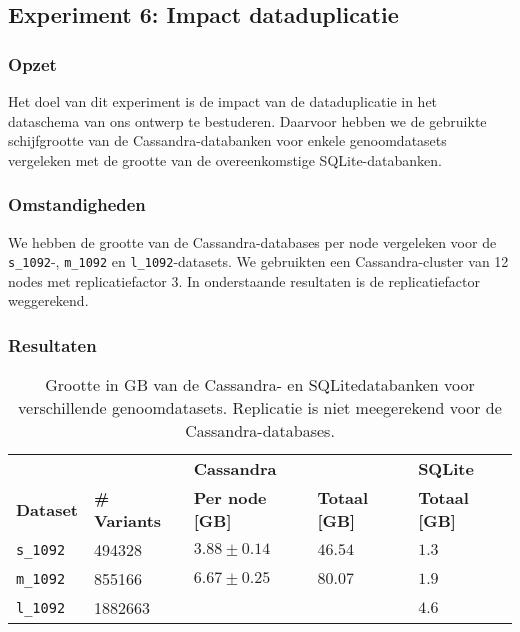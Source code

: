 \subsection{Experiment 6: Impact dataduplicatie}
\label{exp6}

\subsubsection{Opzet}
Het doel van dit experiment is de impact van de dataduplicatie in het dataschema van ons ontwerp te bestuderen. Daarvoor hebben we de gebruikte schijfgrootte van de Cassandra-databanken voor enkele genoomdatasets vergeleken met de grootte van de overeenkomstige SQLite-databanken.

\subsubsection{Omstandigheden}

We hebben de grootte van de Cassandra-databases per node vergeleken voor de \texttt{s\_1092}-,  \texttt{m\_1092} en \texttt{l\_1092}-datasets. We gebruikten een Cassandra-cluster van 12 nodes met replicatiefactor 3. In onderstaande resultaten is de replicatiefactor weggerekend.

\newpage
\subsubsection{Resultaten}

\begin{table}[h]
\centering
\begin{tabular}{@{}lllll@{}}
\cmidrule(l){3-5}
           &     & \multicolumn{2}{|l|}{\textbf{Cassandra}}                                                      & \multicolumn{1}{l|}{\textbf{SQLite}}                             \\ 
\cmidrule(l){1-5}
\multicolumn{1}{|l|}{\textbf{Dataset}} & \multicolumn{1}{l|}{\textbf{\# Variants}} & \multicolumn{1}{l|}{\textbf{Per node [GB]}}               & \multicolumn{1}{l|}{\textbf{Totaal [GB]}} & \multicolumn{1}{l|}{\textbf{Totaal [GB]}} \\ \midrule
\multicolumn{1}{|l|}{\texttt{s\_1092}} & \multicolumn{1}{l|}{494328} & \multicolumn{1}{l|}{$3.88 \pm 0.14$}             & \multicolumn{1}{l|}{$46.54$}          & \multicolumn{1}{l|}{$1.3$}                          \\
\multicolumn{1}{|l|}{\texttt{m\_1092}} & \multicolumn{1}{l|}{855166} & \multicolumn{1}{l|}{$6.67 \pm 0.25$}             & \multicolumn{1}{l|}{$80.07$}          & \multicolumn{1}{l|}{$1.9$}                          \\
\multicolumn{1}{|l|}{\texttt{l\_1092}} & \multicolumn{1}{l|}{1882663} & \multicolumn{1}{l|}{$ $}             & \multicolumn{1}{l|}{$ $}          & \multicolumn{1}{l|}{$4.6$}                          \\
\bottomrule
\end{tabular}
\caption{Grootte in GB van de Cassandra- en SQLitedatabanken voor verschillende genoomdatasets. Replicatie is niet meegerekend voor de Cassandra-databases.}
\end{table}

